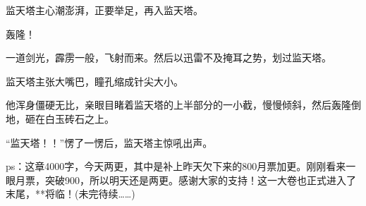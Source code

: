 \begin{this_body}
监天塔主心潮澎湃，正要举足，再入监天塔。

轰隆！

一道剑光，霹雳一般，飞射而来。然后以迅雷不及掩耳之势，划过监天塔。

监天塔主张大嘴巴，瞳孔缩成针尖大小。

他浑身僵硬无比，亲眼目睹着监天塔的上半部分的一小截，慢慢倾斜，然后轰隆倒地，砸在白玉砖石之上。

“监天塔！！”愣了一愣后，监天塔主惊吼出声。

ps：这章4000字，今天两更，其中是补上昨天欠下来的800月票加更。刚刚看来一眼月票，突破900，所以明天还是两更。感谢大家的支持！这一大卷也正式进入了末尾，**将临！(未完待续……)

\end{this_body}

